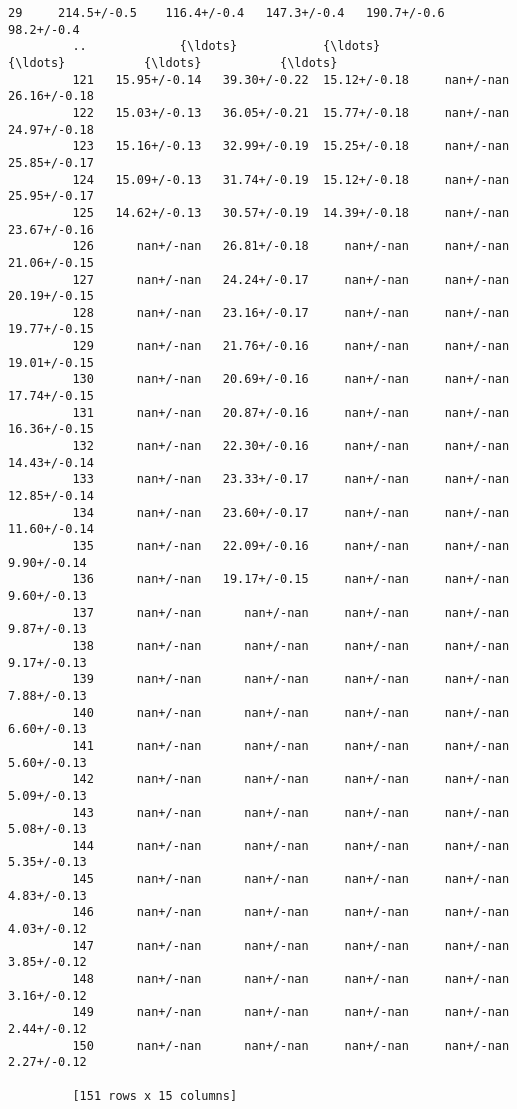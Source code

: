 \documentclass[11pt]{article}
\begin{document}
\begin{Verbatim}[commandchars=\\\{\}]
         29     214.5+/-0.5    116.4+/-0.4   147.3+/-0.4   190.7+/-0.6    98.2+/-0.4  
         ..             {\ldots}            {\ldots}           {\ldots}           {\ldots}           {\ldots}  
         121   15.95+/-0.14   39.30+/-0.22  15.12+/-0.18     nan+/-nan  26.16+/-0.18  
         122   15.03+/-0.13   36.05+/-0.21  15.77+/-0.18     nan+/-nan  24.97+/-0.18  
         123   15.16+/-0.13   32.99+/-0.19  15.25+/-0.18     nan+/-nan  25.85+/-0.17  
         124   15.09+/-0.13   31.74+/-0.19  15.12+/-0.18     nan+/-nan  25.95+/-0.17  
         125   14.62+/-0.13   30.57+/-0.19  14.39+/-0.18     nan+/-nan  23.67+/-0.16  
         126      nan+/-nan   26.81+/-0.18     nan+/-nan     nan+/-nan  21.06+/-0.15  
         127      nan+/-nan   24.24+/-0.17     nan+/-nan     nan+/-nan  20.19+/-0.15  
         128      nan+/-nan   23.16+/-0.17     nan+/-nan     nan+/-nan  19.77+/-0.15  
         129      nan+/-nan   21.76+/-0.16     nan+/-nan     nan+/-nan  19.01+/-0.15  
         130      nan+/-nan   20.69+/-0.16     nan+/-nan     nan+/-nan  17.74+/-0.15  
         131      nan+/-nan   20.87+/-0.16     nan+/-nan     nan+/-nan  16.36+/-0.15  
         132      nan+/-nan   22.30+/-0.16     nan+/-nan     nan+/-nan  14.43+/-0.14  
         133      nan+/-nan   23.33+/-0.17     nan+/-nan     nan+/-nan  12.85+/-0.14  
         134      nan+/-nan   23.60+/-0.17     nan+/-nan     nan+/-nan  11.60+/-0.14  
         135      nan+/-nan   22.09+/-0.16     nan+/-nan     nan+/-nan   9.90+/-0.14  
         136      nan+/-nan   19.17+/-0.15     nan+/-nan     nan+/-nan   9.60+/-0.13  
         137      nan+/-nan      nan+/-nan     nan+/-nan     nan+/-nan   9.87+/-0.13  
         138      nan+/-nan      nan+/-nan     nan+/-nan     nan+/-nan   9.17+/-0.13  
         139      nan+/-nan      nan+/-nan     nan+/-nan     nan+/-nan   7.88+/-0.13  
         140      nan+/-nan      nan+/-nan     nan+/-nan     nan+/-nan   6.60+/-0.13  
         141      nan+/-nan      nan+/-nan     nan+/-nan     nan+/-nan   5.60+/-0.13  
         142      nan+/-nan      nan+/-nan     nan+/-nan     nan+/-nan   5.09+/-0.13  
         143      nan+/-nan      nan+/-nan     nan+/-nan     nan+/-nan   5.08+/-0.13  
         144      nan+/-nan      nan+/-nan     nan+/-nan     nan+/-nan   5.35+/-0.13  
         145      nan+/-nan      nan+/-nan     nan+/-nan     nan+/-nan   4.83+/-0.13  
         146      nan+/-nan      nan+/-nan     nan+/-nan     nan+/-nan   4.03+/-0.12  
         147      nan+/-nan      nan+/-nan     nan+/-nan     nan+/-nan   3.85+/-0.12  
         148      nan+/-nan      nan+/-nan     nan+/-nan     nan+/-nan   3.16+/-0.12  
         149      nan+/-nan      nan+/-nan     nan+/-nan     nan+/-nan   2.44+/-0.12  
         150      nan+/-nan      nan+/-nan     nan+/-nan     nan+/-nan   2.27+/-0.12  
         
         [151 rows x 15 columns]
\end{Verbatim}
            
\end{document}
